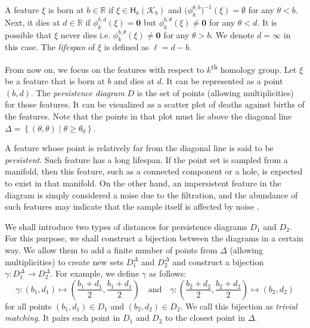 \documentclass[sn-mathphys-num]{sn-jnl}%
\theoremstyle{thmstyleone}%
\theoremstyle{thmstyletwo}%
\theoremstyle{thmstylethree}%
\begin{document}
A feature $\xi$ is born at $b \in \mathbb{R}$ if $\xi \in \mathsf{H}_k(\mathcal{K}_b)$ and $\big(\phi_k^{\theta, b}\big)^{-1}(\xi)=\emptyset$ for any $\theta<b$. Next, it dies at $d \in \mathbb{R}$ if $\phi_k^{b, d}(\xi)=\boldsymbol{0}$ but $\phi_k^{b, \theta}(\xi) \neq \boldsymbol{0}$ for any $\theta<d$. It is possible that $\xi$ never dies i.e. $\phi_k^{b, \theta}(\xi) \neq \boldsymbol{0}$ for any $\theta>b$. We denote $d=\infty$ in this case. The \emph{lifespan} of $\xi$ is defined as $\ell=d-b$.

From now on, we focus on the features with respect to $k$\textsuperscript{th} homology group. Let $\xi$ be a feature that is born at $b$ and dies at $d$. It can be represented as a point $(b, d)$. The \emph{persistence diagram} $D$ is the set of points (allowing multiplicities) for those features. It can be visualized as a scatter plot of deaths against births of the features. Note that the points in that plot must lie above the diagonal line $\Delta=\left\{(\theta, \theta) \mid \theta \geq \theta_0\right\}$.

A feature whose point is relatively far from the diagonal line is said to be \emph{persistent}. Such feature has a long lifespan. If the point set is sampled from a manifold, then this feature, such as a connected component or a hole, is expected to exist in that manifold. On the other hand, an impersistent feature in the diagram is simply considered a noise due to the filtration, and the abundance of such features may indicate that the sample itself is affected by noise \cite{Ravishanker}.

We shall introduce two types of distances for persistence diagrams $D_1$ and $D_2$. For this purpose, we shall construct a bijection between the diagrams in a certain way. We allow them to add a finite number of points from $\Delta$ (allowing multiplicities) to create new sets $D_1^{\Delta}$ and $D_2^{\Delta}$ and construct a bijection $\gamma: D_1^{\Delta} \rightarrow D_2^{\Delta}$. For example, we define $\gamma$ as follows:
\begin{equation*}
	\gamma:\left(b_1, d_1\right) \mapsto\left(\frac{b_1+d_1}{2}, \frac{b_1+d_1}{2}\right) \quad \textrm{and} \quad \gamma:\left(\frac{b_2+d_2}{2}, \frac{b_2+d_2}{2}\right) \mapsto\left(b_2, d_2\right)
\end{equation*}
for all points $(b_1, d_1) \in D_1$ and $(b_2, d_2) \in D_2$. We call this bijection as \emph{trivial matching}. It pairs each point in $D_1$ and $D_2$ to the closest point in $\Delta$.
\end{document}
